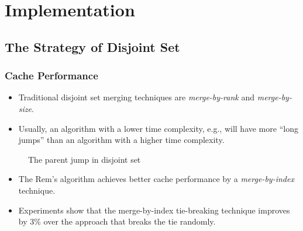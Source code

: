 \section{Implementation}

\subsection{The Strategy of Disjoint Set}

\begin{frame}
	\frametitle{Cache Performance}
	\begin{itemize}
		\setlength\itemsep{1em}
		\item
			Traditional disjoint set merging techniques are {\em merge-by-rank}
			and {\em merge-by-size}. 
		\item
			Usually, an algorithm with a lower time complexity, e.g.,
			will have more ``long jumps'' than an algorithm with a
			higher time complexity.
	\end{itemize}
	\begin{center}
	\scalebox{0.7} { \begin{minipage}{1.5\textwidth}
				\begin{figure}[!thb]
			  \centering {} 
			  \caption{The parent jump in disjoint set}
			  \label{fig:long-short-jump-disjoint}
			\end{figure}
			\end{minipage}
		}
	\end{center}
\end{frame}

\begin{frame}
	\begin{itemize}
		\setlength\itemsep{1em}
		\item
			The Rem's algorithm achieves better cache performance by a
			{\em merge-by-index} technique.
		\item
			Experiments show that the merge-by-index tie-breaking
			technique improves by 3\% over the approach that breaks the
			tie randomly.
	\end{itemize}
\end{frame}

